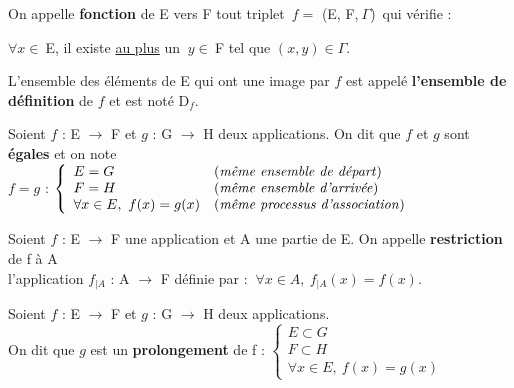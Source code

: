 \vspace{1cm}

\noindent
On appelle \textbf{fonction} de E vers F tout triplet \(\,f= \) (E, F,\(\ \Gamma\))\, qui vérifie :\vspace{-0.2cm}
\begin{center}
    \(\forall x\in\ \)E, il existe \underline{au plus} un \(\ y\in\ \)F tel que \((x,y)\in \Gamma\).
\end{center}
L'ensemble des éléments de E qui ont une image par \(f\) est appelé \textbf{l'ensemble de définition} de \(f\) et est noté D\(_f\).


\vspace{1.3cm}

\noindent Soient \(f\) : E \(\to\) F et \(g\) : G \(\to\) H deux applications. On dit que \(f\) et \(g\) sont \textbf{égales} et on note \vspace{0.1cm} \\
\(f=g\) \ssi : \(\left\{ 
\begin{array}{ll}
     E=G & \text{(\emph{même ensemble de départ})} \\
     F=H & \text{(\emph{même ensemble d'arrivée})} \\
     \forall x\in E,\ f(x)=g(x) & \text{(\emph{même processus d'association})} 
\end{array}\right. \)

\vspace{1.3cm}

Soient \(f\) : E \(\to\) F une application et A une partie de E. On appelle \textbf{restriction} de f à A\\
l'application \(f_{|A}\) : A \(\to\) F définie par : \(\ \forall x\in A,\ f_{|A}(x)=f(x). \)

\vspace{0.8cm}

\noindent Soient \(f\) : E \(\to\) F et \(g\) : G \(\to\) H deux applications.\vspace{-0.5cm}\\
On dit que \(g\) est un \textbf{prolongement} de f \ssi : \(\left\{ 
\begin{array}{l}
     E\subset G \\
     F\subset H\\
     \forall x\in E,\ f(x)=g(x)
\end{array}  \right.  
\)


\vspace{1cm}

